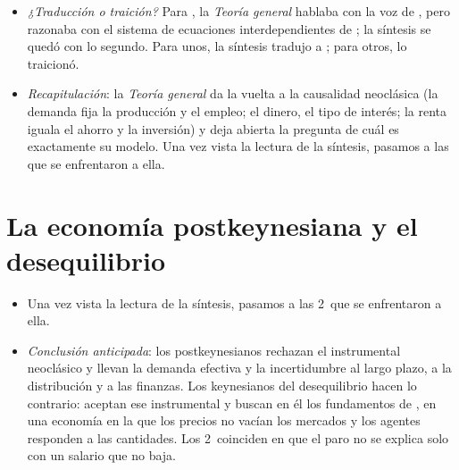 \documentclass[11pt]{article}
\begin{document}
\begin{itemize}
\begin{itemize}
  \item \textcite{Modigliani1944Liquidity} muestra que, con salarios flexibles y sin trampa de la liquidez, el modelo vuelve al pleno empleo: el paro keynesiano pasa a depender de la rigidez del salario nominal.
  \item Es el modelo de la \emph{síntesis neoclásica}, que lo completará con la curva de . Para la síntesis,  queda como el caso particular de los salarios rígidos, no como una «teoría general».
  \end{itemize}
\item \emph{¿Traducción o traición?} Para \textcite{Patinkin1987Keynes}, la \emph{Teoría general} hablaba con la voz de , pero razonaba con el sistema de ecuaciones interdependientes de ; la síntesis se quedó con lo segundo. Para unos, la síntesis tradujo a ; para otros, lo traicionó.
\item \emph{Recapitulación}: la \emph{Teoría general} da la vuelta a la causalidad neoclásica (la demanda fija la producción y el empleo; el dinero, el tipo de interés; la renta iguala el ahorro y la inversión) y deja abierta la pregunta de cuál es exactamente su modelo. Una vez vista la lectura de la síntesis, pasamos a las que se enfrentaron a ella.
\end{itemize}

\section{La economía postkeynesiana y el desequilibrio}\label{sec:herederos}

\begin{itemize}
\item Una vez vista la lectura de la síntesis, pasamos a las 2~que se enfrentaron a ella.
\item \emph{Conclusión anticipada}: los postkeynesianos rechazan el instrumental neoclásico y llevan la demanda efectiva y la incertidumbre al largo plazo, a la distribución y a las finanzas. Los keynesianos del desequilibrio hacen lo contrario: aceptan ese instrumental y buscan en él los fundamentos de , en una economía en la que los precios no vacían los mercados y los agentes responden a las cantidades. Los 2~coinciden en que el paro no se explica solo con un salario que no baja.
\end{itemize}
\end{document}
